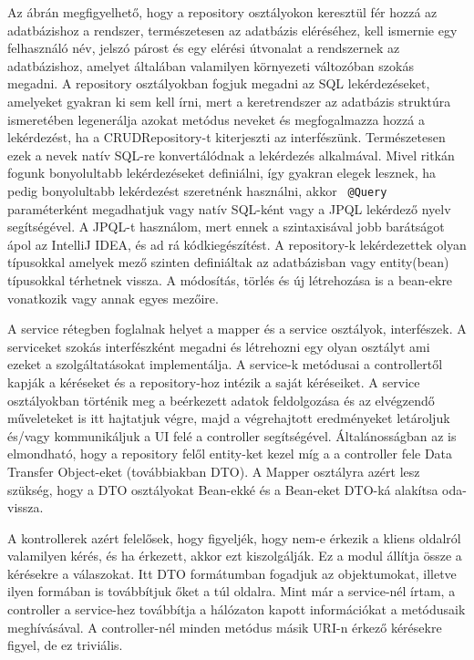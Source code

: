 Az ábrán megfigyelhető, hogy a repository osztályokon keresztül fér hozzá az adatbázishoz a rendszer, természetesen az adatbázis eléréséhez, kell ismernie egy felhasználó név, jelszó párost és egy elérési útvonalat a rendszernek az adatbázishoz, amelyet általában valamilyen környezeti változóban szokás megadni. A repository osztályokban fogjuk megadni az SQL lekérdezéseket, amelyeket gyakran ki sem kell írni, mert a keretrendszer az adatbázis struktúra ismeretében legenerálja azokat metódus neveket és megfogalmazza hozzá a lekérdezést, ha a CRUDRepository-t kiterjeszti az interfészünk. Természetesen ezek a nevek natív SQL-re konvertálódnak a lekérdezés alkalmával. Mivel ritkán fogunk bonyolultabb lekérdezéseket definiálni, így gyakran elegek lesznek, ha pedig bonyolultabb lekérdezést szeretnénk használni, akkor \texttt{ @Query } paraméterként megadhatjuk vagy natív SQL-ként vagy a JPQL lekérdező nyelv segítségével. A JPQL-t használom, mert ennek a szintaxisával jobb barátságot ápol az IntelliJ IDEA, és ad rá kódkiegészítést. A repository-k  lekérdezettek olyan típusokkal amelyek mező szinten definiáltak az adatbázisban vagy entity(bean) típusokkal térhetnek vissza. A módosítás, törlés és új létrehozása is a bean-ekre vonatkozik vagy annak egyes mezőire.

A service rétegben foglalnak helyet a mapper és a service osztályok, interfészek. A serviceket szokás interfészként megadni és létrehozni egy olyan osztályt ami ezeket a szolgáltatásokat implementálja. A service-k metódusai a controllertől kapják a kéréseket és a repository-hoz intézik a saját kéréseiket.  A service osztályokban történik meg a beérkezett adatok feldolgozása és az elvégzendő műveleteket is itt hajtatjuk végre, majd a végrehajtott eredményeket letároljuk és/vagy kommunikáljuk a UI felé a controller segítségével. Általánosságban az is elmondható, hogy a repository felől entity-ket kezel míg a a controller fele Data Transfer Object-eket (továbbiakban DTO). A Mapper osztályra azért lesz szükség, hogy a DTO osztályokat Bean-ekké és a Bean-eket DTO-ká alakítsa oda-vissza.

A kontrollerek azért felelősek, hogy figyeljék, hogy nem-e érkezik a kliens oldalról valamilyen kérés, és ha érkezett, akkor ezt kiszolgálják. Ez a modul állítja össze a kérésekre a válaszokat. Itt DTO formátumban fogadjuk az objektumokat, illetve ilyen formában is továbbítjuk őket a túl oldalra. Mint már a service-nél írtam, a controller a service-hez továbbítja a hálózaton kapott információkat a metódusaik meghívásával. A controller-nél minden metódus másik URI-n érkező kérésekre figyel, de ez triviális.

